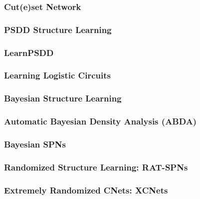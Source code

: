 			\subsubsection{Cut(e)set Network} %

			\subsubsection{PSDD Structure Learning} %

			\subsubsection{LearnPSDD} %

			\subsubsection{Learning Logistic Circuits} %

			\subsubsection{Bayesian Structure Learning} %

			\subsubsection{Automatic Bayesian Density Analysis (ABDA)} %

			\subsubsection{Bayesian SPNs} %

			\subsubsection{Randomized Structure Learning: RAT-SPNs} %

			\subsubsection{Extremely Randomized CNets: XCNets} %

